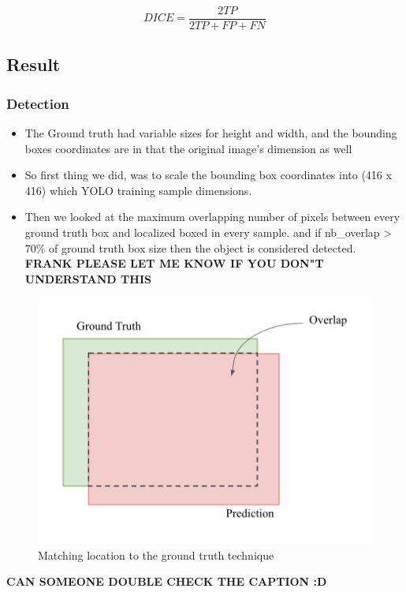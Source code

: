 \documentclass[12pt]{article}
\begin{document}
\begin{equation}
    DICE = \frac{2TP}{2TP + FP + FN} 
\end{equation}

\subsection{Result}

\subsubsection{Detection} 

\begin{itemize}
    \item The Ground truth had variable sizes for height and width, and the bounding boxes coordinates are in that the original image's dimension as well 
    \item So first thing we did, was to scale the bounding box coordinates into (416 x 416) which YOLO training sample dimensions. 
    \item Then we looked at the maximum overlapping number of pixels between every ground truth box and localized boxed in every sample. and if nb\_overlap > 70\% of ground truth box size then the object is considered detected. 
    \textbf{FRANK PLEASE LET ME KNOW IF YOU DON"T UNDERSTAND THIS}
\end{itemize}

\begin{figure}[!htb]
    \centering
    \includegraphics[width=.8\linewidth]{detection_overlap.png}
    \caption{Matching location to the ground truth technique}
\end{figure}
    
\textbf{CAN SOMEONE DOUBLE CHECK THE CAPTION :D}
\end{document}
